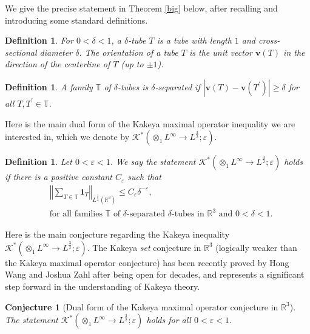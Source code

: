 \documentclass{amsart}%
\theoremstyle{plain}
\newtheorem{conjecture}[theorem]{Conjecture}
\newtheorem{definition}[theorem]{Definition}
\numberwithin{equation}{section}
\begin{document}
We give the precise statement in Theorem \ref{big} below, after recalling and
introducing some standard definitions.

\begin{definition}
For $0<\delta<1$, a $\delta$-tube $T$ is a tube with length $1$ and
cross-sectional diameter $\delta$. The \emph{orientation} of a tube $T$ is the
unit vector $\mathbf{v}\left(  T\right)  $ in the direction of the centerline
of $T$ (up to $\pm1$).
\end{definition}

\begin{definition}
A family $\mathbb{T}$ of $\delta$-tubes is $\delta$-separated if $\left\vert
\mathbf{v}\left(  T\right)  -\mathbf{v}\left(  T^{\prime}\right)  \right\vert
\geq\delta$ for all $T,T^{\prime}\in\mathbb{T}$.
\end{definition}

Here is the main dual form of the Kakeya maximal operator inequality we are
interested in, which we denote by $\mathcal{K}^{\ast}\left(  \otimes
_{1}L^{\infty}\rightarrow L^{\frac{3}{2}};\varepsilon\right)  $.

\begin{definition}
Let $0<\varepsilon<1$. We say the statement $\mathcal{K}^{\ast}\left(
\otimes_{1}L^{\infty}\rightarrow L^{\frac{3}{2}};\varepsilon\right)  $ holds
if there is a positive constant $C_{\varepsilon}$ such that%
\begin{align}
&  \left\Vert \sum_{T\in\mathbb{T}}\mathbf{1}_{T}\right\Vert _{L^{\frac{3}{2}%
}\left(  \mathbb{R}^{3}\right)  }\leq C_{\varepsilon}\delta^{-\varepsilon
},\label{Kak dual}\\
&  \text{for all families }\mathbb{T}\text{ of }\delta\text{-separated }%
\delta\text{-tubes in }\mathbb{R}^{3}\text{ and }0<\delta<1.\nonumber
\end{align}

\end{definition}

Here is the main conjecture regarding the Kakeya inequality $\mathcal{K}%
^{\ast}\left(  \otimes_{1}L^{\infty}\rightarrow L^{\frac{3}{2}};\varepsilon
\right)  $. The Kakeya \emph{set} conjecture in $\mathbb{R}^{3}$ (logically
weaker than the Kakeya maximal operator conjecture) has been recently proved
by Hong Wang and Joshua Zahl \cite{WaZa} after being open for decades, and
represents a significant step forward in the understanding of Kakeya theory.

\begin{conjecture}
[Dual form of the Kakeya maximal operator conjecture in $\mathbb{R}^{3}$%
]\label{linear Kakeya}The statement $\mathcal{K}^{\ast}\left(  \otimes
_{1}L^{\infty}\rightarrow L^{\frac{3}{2}};\varepsilon\right)  $ holds for all
$0<\varepsilon<1$.
\end{conjecture}
\end{document}
